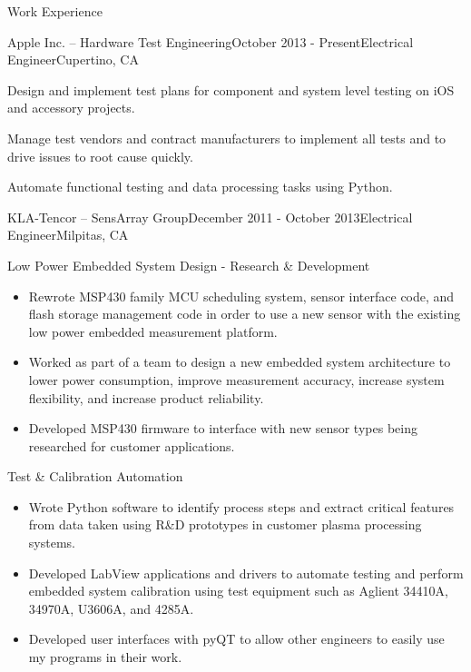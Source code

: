 \documentclass{resume} %
\begin{document}
\vspace{0.5em}
\begin{rSection}{Work Experience}
\vspace{-0.5em}
\begin{rSubsection}{Apple Inc. -- Hardware Test Engineering}{October 2013 - Present}{Electrical Engineer}{Cupertino, CA}
\item Design and implement test plans for component and system level testing on iOS and accessory projects.
\item Manage test vendors and contract manufacturers to implement all tests and to drive issues to root cause quickly.
\item Automate functional testing and data processing tasks using Python.
\end{rSubsection}


\ssquish
\begin{rSubsection2}{KLA-Tencor -- SensArray Group}{December 2011 - October 2013}{Electrical Engineer}{Milpitas, CA}
\item Low Power Embedded System Design - Research \& Development 
\begin{itemize}
\itemsep -0.5em \vspace{-0.5em}
\renewcommand{\labelitemi}{-}
\item Rewrote MSP430 family MCU scheduling system, sensor interface code, and flash storage management code in order to use a new sensor with the existing low power embedded measurement platform.
\item Worked as part of a team to design a new embedded system architecture to lower power consumption, improve measurement accuracy, increase system flexibility, and increase product reliability.
\item Developed MSP430 firmware to interface with new sensor types being researched for customer applications.
\end{itemize}

\smallskip
\item Test \& Calibration Automation
\begin{itemize}
\itemsep -0.5em \vspace{-0.5em}
\renewcommand{\labelitemi}{-}
\item Wrote Python software to identify process steps and extract critical features from data taken using R\&D prototypes in customer plasma processing systems.
\item Developed LabView applications and drivers to automate testing and perform embedded system calibration using test equipment such as Aglient 34410A, 34970A, U3606A, and 4285A.
\item Developed user interfaces with pyQT to allow other engineers to easily use my programs in their work.
\end{itemize}
\end{rSubsection2}


\end{rSection}
\end{document}
